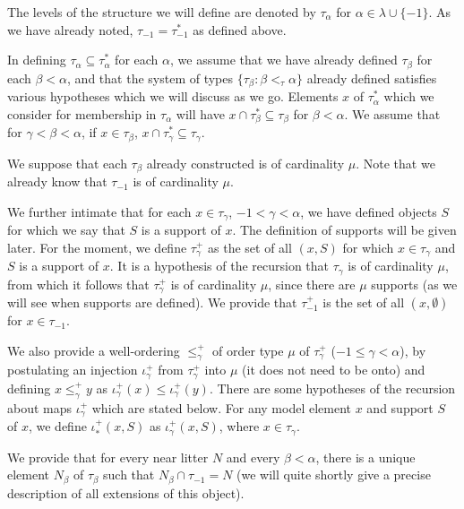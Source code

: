 \documentclass[112pt]{article}
\begin{document}
The levels of the structure we will define are denoted by $\tau_\alpha$ for \newline $\alpha \in \lambda \cup \{-1\}$.  As we have already noted, $\tau_{-1}=\tau^*_{-1}$ as defined above.

In defining $\tau_\alpha \subseteq \tau^*_\alpha$ for each $\alpha$, we assume that we have already defined $\tau_\beta$ for each $\beta<\alpha$, and that the system of types $\{\tau_\beta:\beta <_\tau \alpha\}$ already defined satisfies various hypotheses which we will discuss as we go.
Elements $x$ of $\tau^*_\alpha$ which we consider for membership in $\tau_\alpha$ will have $x \cap \tau^*_\beta \subseteq \tau_\beta$ for $\beta<\alpha$.  We assume that for $\gamma<\beta<\alpha$, if $x \in \tau_\beta$, $x \cap \tau^*_\gamma \subseteq \tau_\gamma$.

We suppose that each $\tau_\beta$ already constructed is of cardinality $\mu$.  Note that we already know that
$\tau_{-1}$ is of cardinality $\mu$.


We further intimate that for each $x \in \tau_\gamma$, $-1<\gamma<\alpha$, we have defined objects $S$ for which we say that $S$ is a support of $x$.  The definition of supports will be given later.  For the moment, we define $\tau_\gamma^+$ as the set of all $(x,S)$ for which $x \in \tau_\gamma$ and $S$ is a support of $x$.  It is a hypothesis of the recursion
that $\tau_\gamma$ is of cardinality $\mu$, from which it follows that  $\tau^+_\gamma$ is of cardinality $\mu$, since there are $\mu$ supports (as we will see when supports are defined). We provide that $\tau_{-1}^+$ is the set
of all $(x,\emptyset)$ for $x \in \tau_{-1}$.  

We also provide a well-ordering $\leq^+_\gamma$ of order type $\mu$ of $\tau_\gamma^+$ ($-1 \leq \gamma <\alpha$), by postulating an injection $\iota^+_\gamma$ from $\tau_\gamma^+$ into $\mu$ (it does not need to be onto) and defining $x \leq^+_\gamma y$ as $\iota^+_\gamma(x) \leq \iota^+_\gamma(y)$.   There are some hypotheses of the recursion about maps $\iota^+_\gamma$ which are stated below.   For any model element $x$ and support $S$ of $x$, we define $\iota^+_*(x,S)$ as $\iota^+_\gamma(x,S)$, where $x \in \tau_\gamma$.


We provide that for every near litter $N$ and every $\beta<\alpha$, there is a unique element $N_\beta$ of $\tau_\beta$ such that $N_\beta \cap \tau_{-1}=N$ (we will quite shortly give a precise description of all extensions of this object).
\end{document}
